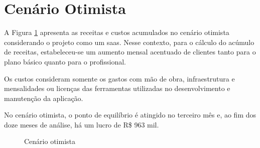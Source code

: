 \section{Cenário Otimista}

A Figura \ref{fig:cenario-otimista} apresenta as receitas e custos acumulados no cenário otimista considerando o projeto como um \gls{saas}. Nesse contexto, para o cálculo do acúmulo de receitas, estabeleceu-se um aumento mensal acentuado de clientes tanto para o plano básico quanto para o profissional.

Os custos consideram somente os gastos com mão de obra, infraestrutura e mensalidades ou licenças das ferramentas utilizadas no desenvolvimento e manutenção da aplicação.

No cenário otimista, o ponto de equilíbrio é atingido no terceiro mês e, ao fim dos doze meses de análise, há um lucro de R\$ 963 mil.

\begin{figure}[h]
	\centering
	\caption{Cenário otimista}
	\label{fig:cenario-otimista}
\end{figure}
